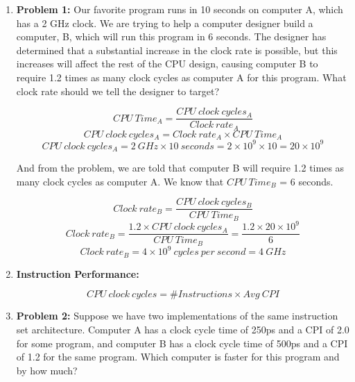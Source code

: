 \documentclass[12pt]{article}
\begin{document}
\begin{enumerate}
    \item \textbf{Problem 1:} Our favorite program runs in 10 seconds on computer A, which has a 2 GHz clock. We are trying to help a computer designer build a computer, B, which will run this program in 6 seconds. The designer has determined that a substantial increase in the clock rate is possible, but this increases will affect the rest of the CPU design, causing computer B to require 1.2 times as many clock cycles as computer A for this program. What clock rate should we tell the designer to target?
        
    \begin{equation*}
        CPU\ Time_{A} = \frac{CPU\ clock\ cycles_{A}}{Clock\ rate_{A}}
    \end{equation*}
    \begin{equation*}
        CPU\ clock\ cycles_{A} = Clock\ rate_{A} \times CPU\ Time_{A}
    \end{equation*}
    \begin{equation*}
        CPU\ clock\ cycles_{A} = 2\ GHz \times 10\ seconds = 2 \times 10^{9} \times 10 = 20 \times 10^{9}
    \end{equation*}
    
    And from the problem, we are told that computer B will require 1.2 times as many clock cycles as computer A. We know that $CPU\ Time_{B}$ = 6 seconds.
    
    \begin{equation*}
        Clock\ rate_{B} = \frac{CPU\ clock\ cycles_{B}}{CPU\ Time_{B}}
    \end{equation*}  
    \begin{equation*}
        Clock\ rate_{B} = \frac{1.2 \times CPU\ clock\ cycles_{A}}{CPU\ Time_{B}} = \frac{1.2 \times 20 \times 10^{9}}{6}
    \end{equation*}  
    \begin{equation*}
        Clock\ rate_{B} = 4 \times 10^{9}\ cycles\ per\ second = 4\ GHz
    \end{equation*}  
    
    \item \textbf{Instruction Performance:}
    
    \begin{equation*}
        CPU\ clock\ cycles = \# Instructions \times Avg\ CPI
    \end{equation*}
    
    \item \textbf{Problem 2:} Suppose we have two implementations of the same instruction set architecture. Computer A has a clock cycle time of 250ps and a CPI of 2.0 for some program, and computer B has a clock cycle time of 500ps and a CPI of 1.2 for the same program. Which computer is faster for this program and by how much?
    

\end{enumerate}
\end{document}
